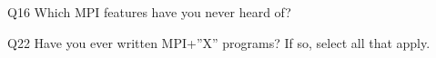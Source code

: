 \begin{description}%
\item{Q16} Which MPI features have you never heard of?%
\item{Q22} Have you ever written MPI+”X” programs? If so, select all that apply.%
\end{description}%

